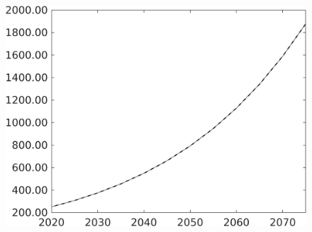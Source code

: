 \documentclass[12pt]{article}
\begin{document}
\begin{figure}[h!!]
\begin{minipage}[]{0.32\textwidth}
	\end{minipage}	
	\begin{minipage}[]{0.32\textwidth}
		\includegraphics[width=1\textwidth]{../../codding_model/own_basedOnFried/optimalPol_010922_revision/figures/all_13Sept22/PerdifNoTauf_regime0_CompTaul_GFF_spillover0_nsk0_xgr0_knspil1_sep1_LFlimit0_emsbase0_countec0_GovRev0_etaa0.79_lgd0.png}
	\end{minipage}
\end{figure}
\end{document}
